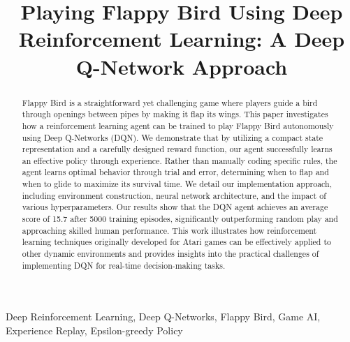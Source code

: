 \documentclass[conference]{IEEEtran}
\begin{document}
\title{Playing Flappy Bird Using Deep Reinforcement Learning: A Deep Q-Network Approach\\}


\maketitle

\begin{abstract}
Flappy Bird is a straightforward yet challenging game where players guide a bird through openings between pipes by making it flap its wings. This paper investigates how a reinforcement learning agent can be trained to play Flappy Bird autonomously using Deep Q-Networks (DQN). We demonstrate that by utilizing a compact state representation and a carefully designed reward function, our agent successfully learns an effective policy through experience. Rather than manually coding specific rules, the agent learns optimal behavior through trial and error, determining when to flap and when to glide to maximize its survival time. We detail our implementation approach, including environment construction, neural network architecture, and the impact of various hyperparameters. Our results show that the DQN agent achieves an average score of 15.7 after 5000 training episodes, significantly outperforming random play and approaching skilled human performance. This work illustrates how reinforcement learning techniques originally developed for Atari games can be effectively applied to other dynamic environments and provides insights into the practical challenges of implementing DQN for real-time decision-making tasks.
\end{abstract}

\begin{IEEEkeywords}
Deep Reinforcement Learning, Deep Q-Networks, Flappy Bird, Game AI, Experience Replay, Epsilon-greedy Policy
\end{IEEEkeywords}










\end{document}
